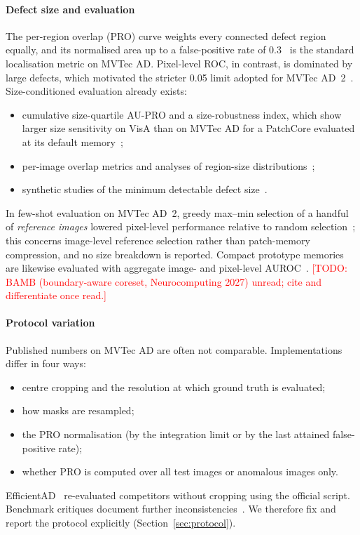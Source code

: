\documentclass[preprint,review,12pt]{elsarticle}
\newcommand{\todo}[1]{\textcolor{red}{[TODO: #1]}}
\begin{document}
\paragraph{Defect size and evaluation}
The per-region overlap (PRO) curve weights every connected defect region
equally, and its normalised area up to a false-positive rate of
0.3~\citep{bergmann2020uninformed,bergmann2021mvtec} is the standard
localisation metric on MVTec AD. Pixel-level ROC, in contrast, is dominated
by large defects, which motivated the stricter 0.05 limit adopted for MVTec
AD~2~\citep{hecklerkram2026mvtecad2}. Size-conditioned evaluation already
exists:
\begin{itemize}
\item cumulative size-quartile AU-PRO and a size-robustness index, which
show larger size sensitivity on VisA than on MVTec AD for a PatchCore
evaluated at its default memory~\citep{costanzino2025pinpoint};
\item per-image overlap metrics and analyses of region-size
distributions~\citep{bertoldo2024aupimo};
\item synthetic studies of the minimum detectable defect
size~\citep{lehr2024limitations}.
\end{itemize}
In few-shot evaluation on MVTec AD~2, greedy max--min selection of a handful
of \emph{reference images} lowered pixel-level performance relative to random
selection~\citep{tu2026fewshotmvtecad2}; this concerns image-level reference
selection rather than patch-memory compression, and no size breakdown is
reported. Compact prototype memories are likewise evaluated with aggregate
image- and pixel-level AUROC~\citep{feng2026hrpro}.
\todo{BAMB (boundary-aware coreset, Neurocomputing 2027) unread; cite and
differentiate once read.}

\paragraph{Protocol variation}
Published numbers on MVTec AD are often not comparable. Implementations
differ in four ways:
\begin{itemize}
\item centre cropping and the resolution at which ground truth is evaluated;
\item how masks are resampled;
\item the PRO normalisation (by the integration limit or by the last
attained false-positive rate);
\item whether PRO is computed over all test images or anomalous images only.
\end{itemize}
EfficientAD~\citep{batzner2024efficientad} re-evaluated competitors without
cropping using the official script. Benchmark critiques document further
inconsistencies~\citep{baitieva2025beyond,rochner2025rethink}. We therefore
fix and report the protocol explicitly (Section~\ref{sec:protocol}).
\end{document}
